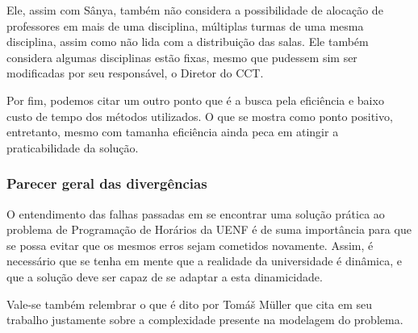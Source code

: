             Ele, assim com Sânya, também não considera a possibilidade de alocação de professores em mais de uma disciplina, múltiplas turmas de uma mesma disciplina, assim como não lida com a distribuição das salas. Ele também considera algumas disciplinas estão fixas, mesmo que pudessem sim ser modificadas por seu responsável, o Diretor do CCT.

            Por fim, podemos citar um outro ponto que é a busca pela eficiência e baixo custo de tempo dos métodos utilizados. O que se mostra como ponto positivo, entretanto, mesmo com tamanha eficiência ainda peca em atingir a praticabilidade da solução.

        \subsubsection{Parecer geral das divergências}

            O entendimento das falhas passadas em se encontrar uma solução prática ao problema de Programação de Horários da UENF é de suma importância para que se possa evitar que os mesmos erros sejam cometidos novamente. Assim, é necessário que se tenha em mente que a realidade da universidade é dinâmica, e que a solução deve ser capaz de se adaptar a esta dinamicidade.

            Vale-se também relembrar o que é dito por Tomáš Müller \cite{burke_modeling_2007} que cita em seu trabalho justamente sobre a complexidade presente na modelagem do problema.

